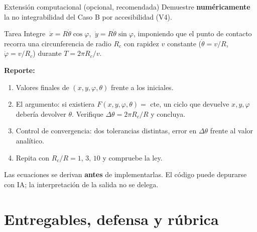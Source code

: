 \documentclass[10pt,aspectratio=169]{beamer}
\begin{document}
\begin{frame}{Extensión computacional (opcional, recomendada)}
  Demuestre \textbf{numéricamente} la no integrabilidad del Caso B por accesibilidad (V4).
  \begin{block}{Tarea}
    Integre $\ \dot x = R\dot\theta\cos\varphi$, $\ \dot y = R\dot\theta\sin\varphi$, imponiendo que el punto de contacto recorra una circunferencia de radio $R_c$ con rapidez $v$ constante
    ($\dot\theta=v/R$, $\dot\varphi=v/R_c$) durante $T=2\pi R_c/v$.
  \end{block}
  \pause
  \textbf{Reporte:}
  \begin{enumerate}\small
    \item Valores finales de $(x,y,\varphi,\theta)$ frente a los iniciales.
    \item El argumento: si existiera $F(x,y,\varphi,\theta)=$ cte, un ciclo que devuelve $x,y,\varphi$ debería devolver $\theta$. Verifique $\Delta\theta = 2\pi R_c/R$ y concluya.
    \item Control de convergencia: dos tolerancias distintas, error en $\Delta\theta$ frente al valor analítico.
    \item Repita con $R_c/R = 1,\,3,\,10$ y compruebe la ley.
  \end{enumerate}
  \pause
  \begin{center}\small
    Las ecuaciones se derivan \textbf{antes} de implementarlas. El código puede depurarse con IA;
    \alert{la interpretación de la salida no se delega.}
  \end{center}
\end{frame}

\section{Entregables, defensa y rúbrica}
\end{document}
